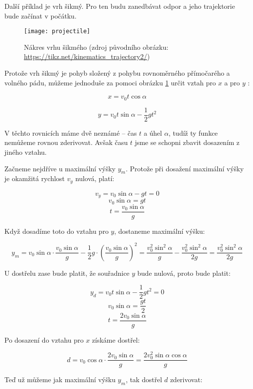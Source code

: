 \documentclass{fkssolpub}
\begin{document}
Další příklad je vrh šikmý. Pro ten budu zanedbávat odpor a jeho 
trajektorie bude začínat v počátku. 


\begin{figure}[h!]
  \centering
  \texttt{[image: projectile]}
  \caption{Nákres vrhu šikmého (zdroj původního obrázku: 
    \url{https://tikz.net/kinematics_trajectory2/})}
  \label{fig:projectile}
\end{figure}

Protože vrh šikmý je pohyb složený z pohybu rovnoměrného přímočarého
a volného pádu, můžeme jednoduše za pomoci obrázku \ref{fig:projectile} určit
vztah pro $x$ a pro $y$ \cite{realisticky_vrh_nodate}:

\[
  x = v_0 t \cos{\alpha}
\]

\[
  y = v_0 t \sin{\alpha} - \frac{1}{2}g t^2
\]

V těchto rovnicích máme dvě neznámé -- čas $t$ a úhel $\alpha$, tudíž
ty funkce nemůžeme rovnou zderivovat. Avšak času $t$ jsme se schopni
zbavit dosazením z jiného vztahu.

Začneme nejdříve u maximální výšky $y_m$. Protože při dosažení maximální
výšky je okamžitá rychlost $v_y$ nulová, platí:

\[
  v_y = v_0 \sin{\alpha} - g t = 0
\]
\[
  v_0 \sin{\alpha} = gt
\]
\[
  t = \frac{v_0 \sin{\alpha}}{g}
\]

Když dosadíme toto do vztahu pro $y$, dostaneme maximální výšku:

\[
  y_m = v_0 \sin{\alpha} \cdot \frac{v_0 \sin{\alpha}}{g} 
   - \frac{1}{2} g \cdot \left(\frac{v_0 \sin{\alpha}}{g}\right)^2
   = \frac{v_0^2 \sin^2{\alpha}}{g} - \frac{v_0^2 \sin^2{\alpha}}{2g}
   = \frac{v_0^2 \sin^2{\alpha}}{2g}
\]

U dostřelu zase bude platit, že souřadnice $y$ bude nulová, proto bude platit:

\[
  y_d = v_0 t \sin{\alpha} - \frac{1}{2} g t^2 = 0
\]
\[
  v_0 \sin{\alpha} = \frac{gt}{2}
\]
\[
  t = \frac{2 v_0 \sin{\alpha}}{g}
\]

Po dosazení do vztahu pro $x$ získáme dostřel:

\[
  d = v_0 \cos{\alpha} \cdot \frac{2 v_0 \sin{\alpha}}{g}
    = \frac{2 v_0^2 \sin{\alpha} \cos{\alpha}}{g}
\]

Teď už můžeme jak maximální výšku $y_m$, tak dostřel $d$ zderivovat:
\end{document}
